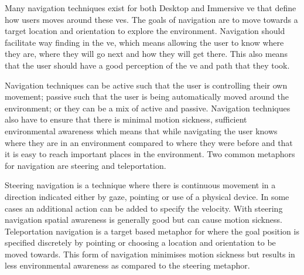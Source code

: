 %
%
%
%
%
%

Many navigation techniques exist for both Desktop and Immersive \acrfull{ve} that define how users moves around these \acrshort{ve}s. The goals of navigation are to move towards a target location and orientation to explore the environment. Navigation should facilitate way finding in the \acrshort{ve}, which means allowing the user to know where they are, where they will go next and how they will get there. This also means that the user should have a good perception of the \acrshort{ve} and path that they took.

Navigation techniques can be active such that the user is controlling their own movement; passive such that the user is being automatically moved around the environment; or they can be a mix of active and passive. Navigation techniques also have to ensure that there is minimal motion sickness, sufficient environmental awareness which means that while navigating the user knows where they are in an environment compared to where they were before and that it is easy to reach important places in the environment. Two common metaphors for navigation are steering and teleportation.

Steering navigation is a technique where there is continuous movement in a direction indicated either by gaze, pointing or use of a physical device. In some cases an additional action can be added to specify the velocity. With steering navigation spatial awareness is generally good but can cause motion sickness. Teleportation navigation is a target based metaphor for where the goal position is specified discretely by pointing or choosing a location and orientation to be moved towards. This form of navigation minimises motion sickness but results in less environmental awareness as compared to the steering metaphor.
